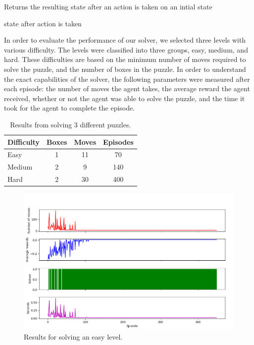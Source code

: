 \documentclass[times, 10pt,twocolumn]{article}
\begin{document}
\begin{algorithm}
  \caption{Returns the resulting state after an action is taken on an intial state}
  \begin{algorithmic}[1]
      \State \Return state after action is taken
    \EndFunction
  \end{algorithmic}
  \label{alg:take_action}
\end{algorithm}


In order to evaluate the performance of our solver, we selected three levels with various difficulty. The levels were classified into three groups, easy, medium, and hard. These difficulties are based on the minimum number of moves required to solve the puzzle, and the number of boxes in the puzzle. In order to understand the exact capabilities of the solver, the following parameters were measured after each episode: the number of moves the agent takes, the average reward the agent received, whether or not the agent was able to solve the puzzle, and the time it took for the agent to complete the episode. 

\begin{table}[htbp]
  \centering
  \begin{tabular}{l c c c} \hline\hline
    Difficulty & Boxes & Moves & Episodes \\ \hline
    Easy & 1 & 11 & 70 \\
    Medium & 2 & 9 & 140 \\
    Hard & 2 & 30 & 400 \\ \hline\hline
  \end{tabular}
  \caption{Results from solving 3 different puzzles.}
  \label{table:results}
\end{table}

\begin{figure}[h] 
  \centering
     \includegraphics[width=\linewidth]{images/easy_graph.png}
  \caption{Results for solving an easy level.}
  \label{fig:e}
\end{figure}
\end{document}
